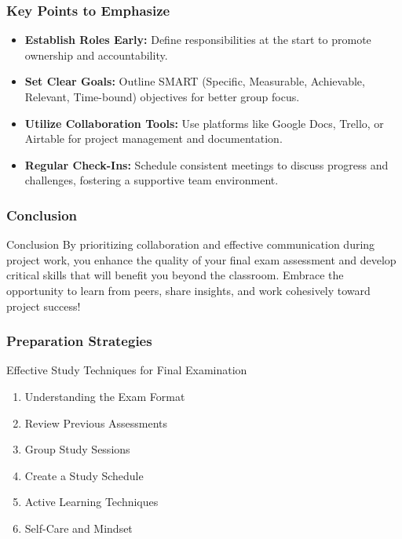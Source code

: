 \documentclass[aspectratio=169]{beamer}
\begin{document}
\begin{frame}[fragile]
    \frametitle{Key Points to Emphasize}
    \begin{itemize}
        \item \textbf{Establish Roles Early:} Define responsibilities at the start to promote ownership and accountability.
        \item \textbf{Set Clear Goals:} Outline SMART (Specific, Measurable, Achievable, Relevant, Time-bound) objectives for better group focus.
        \item \textbf{Utilize Collaboration Tools:} Use platforms like Google Docs, Trello, or Airtable for project management and documentation.
        \item \textbf{Regular Check-Ins:} Schedule consistent meetings to discuss progress and challenges, fostering a supportive team environment.
    \end{itemize}
\end{frame}

\begin{frame}[fragile]
    \frametitle{Conclusion}
    \begin{block}{Conclusion}
        By prioritizing collaboration and effective communication during project work, you enhance the quality of your final exam assessment and develop critical skills that will benefit you beyond the classroom. Embrace the opportunity to learn from peers, share insights, and work cohesively toward project success!
    \end{block}
\end{frame}

\begin{frame}[fragile]
    \frametitle{Preparation Strategies}
    \begin{block}{Effective Study Techniques for Final Examination}
        \begin{enumerate}
            \item Understanding the Exam Format
            \item Review Previous Assessments
            \item Group Study Sessions
            \item Create a Study Schedule
            \item Active Learning Techniques
            \item Self-Care and Mindset
        \end{enumerate}
    \end{block}
\end{frame}
\end{document}
